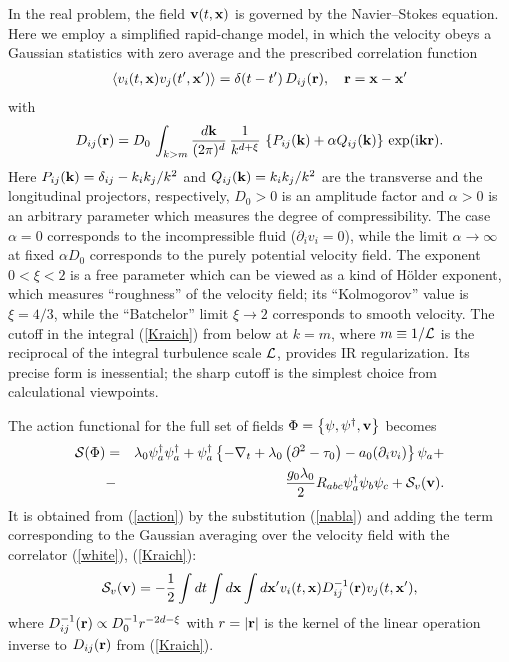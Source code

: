 \documentclass[12pt]{iopart}
\begin{document}
In the real problem, the field ${\bf v}(t,{\bf x})$ is governed by the
Navier--Stokes equation. Here we employ a simplified rapid-change model,
in which the velocity obeys a Gaussian statistics with zero average and
the prescribed correlation function
\begin{eqnarray}
\langle v_{i}(t, {\bf x}) v_{j}(t',{\bf x'})\rangle =  \delta(t-t')\,
D_{ij}({\bf r}), \quad {\bf r} = {\bf x}-{\bf x'}
\label{white}
\end{eqnarray}
with
\begin{eqnarray}
D_{ij}({\bf r}) = D_{0}\, \int_{k>m} \frac{d{\bf k}}{(2\pi)^{d}} \,
\frac{1}{k^{d+\xi}}\,
\left\{ P_{ij}({\bf k})+\alpha Q_{ij}({\bf k}) \right\}\,
\exp ({\rm i} {\bf kr} ).
\label{Kraich}
\end{eqnarray}
Here $P_{ij}({\bf k}) = \delta_{ij} - k_i k_j / k^2$ and
$Q_{ij}({\bf k})=k_i k_j/k^2$ are the transverse and the longitudinal
projectors, respectively,
$D_{0}>0$ is an amplitude factor and $\alpha>0$ is an arbitrary
parameter which measures the degree of compressibility.
The case $\alpha=0$ corresponds to the incompressible fluid
($\partial _i v_{i}=0$), while the limit $\alpha \to\infty$ at fixed
$\alpha D_{0}$ corresponds to the purely potential velocity field.
The exponent $0<\xi<2$ is a free parameter which can be viewed as a kind
of H\"{o}lder exponent, which measures ``roughness'' of the velocity field;
its ``Kolmogorov'' value is $\xi=4/3$, while the ``Batchelor'' limit
$\xi\to2$ corresponds to smooth velocity. The cutoff in the
integral (\ref{Kraich}) from below at $k=m$, where $m\equiv 1/{\cal L}$ is
the reciprocal of the integral turbulence scale ${\cal L}$, provides IR
regularization. Its precise form is inessential; the sharp cutoff is the
simplest choice from calculational viewpoints.

The action functional for the full set of fields $\Phi = \left\{
\psi,\psi^{\dag},{\bf v} \right\}$ becomes
\begin{eqnarray}
{\cal S}(\Phi) &=& \lambda_{0} \psi^{\dag}_{a}\psi^{\dag}_{a}+
\psi^{\dag}_{a} \left\{ -\nabla_{t} +
\lambda_{0}\left( \partial^{2}- \tau_{0}\right)
- a_{0} (\partial_{i}v_{i}) \right\} \psi_{a} +
\nonumber \\
 &-&  \frac{g_{0}\lambda_{0}}{2}R_{abc} \psi^{\dag}_{a}
\psi_{b}\psi_{c} +  {\cal S}_{v}({\bf v}).
\label{Action}
\end{eqnarray}
It is obtained from (\ref{action}) by the substitution
(\ref{nabla}) and adding the term corresponding to the Gaussian averaging
over the velocity field with the correlator (\ref{white}), (\ref{Kraich}):
\begin{eqnarray}
{\cal S}_{v}({\bf v}) = -\frac{1}{2} \int dt \int d{\bf x} \int d{\bf x'}
v_{i} (t,{\bf x}) D_{ij}^{-1}({\bf r}) v_{j} (t, {\bf x'}),
\label{Sv}
\end{eqnarray}
where $D_{ij}^{-1}({\bf r}) \propto D_{0}^{-1} r^{-2d-\xi}$ with
$r=|{\bf r}|$ is the kernel of the linear operation inverse to
$D_{ij}({\bf r})$ from (\ref{Kraich}).
\end{document}
